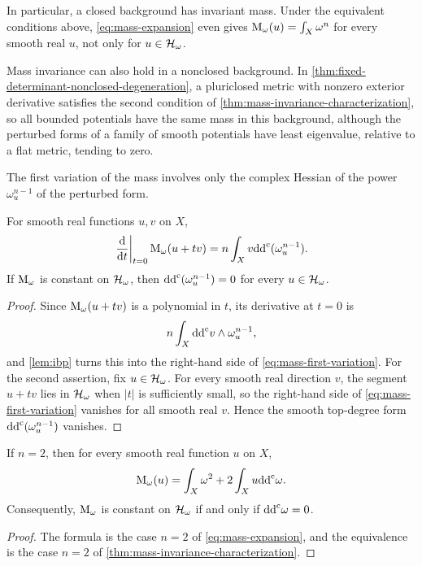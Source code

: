 In particular, a closed background has invariant mass. Under the equivalent conditions above, \eqref{eq:mass-expansion} even gives $\mathrm M_\omega(u)=\int_X\omega^n$ for every smooth real $u$, not only for $u\in\mathcal H_\omega$.

Mass invariance can also hold in a nonclosed background. In \cref{thm:fixed-determinant-nonclosed-degeneration}, a pluriclosed metric with nonzero exterior derivative satisfies the second condition of \cref{thm:mass-invariance-characterization}, so all bounded potentials have the same mass in this background, although the perturbed forms of a family of smooth potentials have least eigenvalue, relative to a flat metric, tending to zero.

The first variation of the mass involves only the complex Hessian of the power $\omega_u^{n-1}$ of the perturbed form.

\begin{proposition}\label{prop:mass-variation}
For smooth real functions $u,v$ on $X$,
\begin{equation}\label{eq:mass-first-variation}
 \left.\frac{\mathrm{d}}{\mathrm{d}t}\right|_{t=0}\mathrm M_\omega(u+tv)
 =n\int_X v\mathrm{dd}^{\mathrm{c}}(\omega_u^{n-1}).
\end{equation}
If $\mathrm M_\omega$ is constant on $\mathcal H_\omega$, then $\mathrm{dd}^{\mathrm{c}}(\omega_u^{n-1})=0$ for every $u\in\mathcal H_\omega$.
\end{proposition}
\begin{proof}
Since $\mathrm M_\omega(u+tv)$ is a polynomial in $t$, its derivative at $t=0$ is
\[
 n\int_X\mathrm{dd}^{\mathrm{c}} v\wedge\omega_u^{n-1},
\]
and \cref{lem:ibp} turns this into the right-hand side of \eqref{eq:mass-first-variation}. For the second assertion, fix $u\in\mathcal H_\omega$. For every smooth real direction $v$, the segment $u+tv$ lies in $\mathcal H_\omega$ when $|t|$ is sufficiently small, so the right-hand side of \eqref{eq:mass-first-variation} vanishes for all smooth real $v$. Hence the smooth top-degree form $\mathrm{dd}^{\mathrm{c}}(\omega_u^{n-1})$ vanishes.
\end{proof}

\begin{corollary}\label{cor:surface-mass}
If $n=2$, then for every smooth real function $u$ on $X$,
\[
 \mathrm M_\omega(u)=\int_X\omega^2+2\int_Xu\mathrm{dd}^{\mathrm{c}}\omega.
\]
Consequently, $\mathrm M_\omega$ is constant on $\mathcal H_\omega$ if and only if $\mathrm{dd}^{\mathrm{c}}\omega=0$.
\end{corollary}
\begin{proof}
The formula is the case $n=2$ of \eqref{eq:mass-expansion}, and the equivalence is the case $n=2$ of \cref{thm:mass-invariance-characterization}.
\end{proof}


